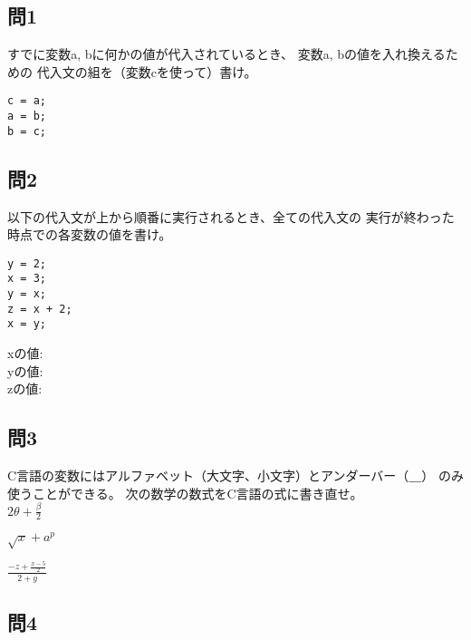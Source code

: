 \documentclass[a4j]{jarticle}
\begin{document}
\begin{multicols*}{2}
\subsection*{問1}


すでに変数{\ttfamily a, b}に何かの値が代入されているとき、
変数{\ttfamily a, b}の値を入れ換えるための
代入文の組を（変数{\ttfamily c}を使って）書け。




\ifnum {}
\vspace*{2cm}
\else
\begin{verbatim}
c = a;
a = b;
b = c;
\end{verbatim}\vspace*{1cm}
\fi



\subsection*{問2}

以下の代入文が上から順番に実行されるとき、全ての代入文の
実行が終わった時点での各変数の値を書け。

\begin{verbatim}
y = 2;
x = 3;
y = x;
z = x + 2;
x = y;
\end{verbatim}


{\ttfamily x}の値:\\

{\ttfamily y}の値:\\

{\ttfamily z}の値:\\




\subsection*{問3}
C言語の変数にはアルファベット（大文字、小文字）とアンダーバー（＿）
のみ使うことができる。
次の数学の数式をC言語の式に書き直せ。\\

$2\theta+\frac{\beta}{2}$

$\sqrt{x}+a^p$

$\frac{-z+\frac{x-5}{2}}{2+y}$




\subsection*{問4}




\end{multicols*}
\end{document}
